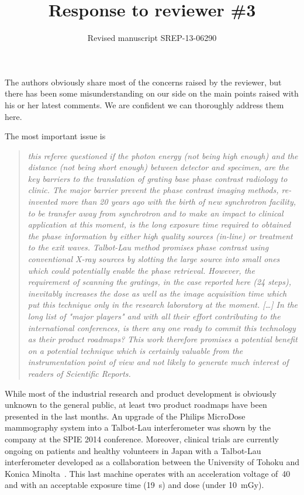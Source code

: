 \documentclass[a4paper,english]{scrartcl}
\title{Response to reviewer \#3}
\author{Revised manuscript SREP-13-06290}
\date{}
\newenvironment{reviewerquote}{\begin{quote}\itshape}{\end{quote}}
\begin{document}
\maketitle

\noindent

The authors obviously share most of the concerns raised by the reviewer, but
there has been some misunderstanding on our side on the main points raised
with his or her latest comments.
We are confident we can thoroughly address them here.

The most important issue is

\begin{reviewerquote}
    this referee questioned if the photon energy (not being high enough) and
    the distance (not being short enough) between detector and specimen, are
    the key barriers to the translation of grating base phase contrast
    radiology to clinic. The major barrier prevent the phase contrast
    imaging methods, re-invented more than 20 years ago with the birth of
    new synchrotron facility, to be transfer away from synchrotron and to
    make an impact to clinical application at this moment, is the long
    exposure time required to obtained the phase information by either high
    quality sources (in-line) or treatment to the exit waves. Talbot-Lau
    method promises phase contrast using conventional X-ray sources by
    slotting the large source into small ones which could potentially enable
    the phase retrieval. However, the requirement of scanning the gratings,
    in the case reported here (24 steps), inevitably increases the dose as
    well as the image acquisition time which put this technique only in the
    research laboratory at the moment. [\ldots] In the long list of "major
    players" and with all their effort contributing to the international
    conferences, is there any one ready to commit this technology as their
    product roadmaps? This work therefore promises a potential benefit on a
    potential technique which is certainly valuable from the instrumentation
    point of view and not likely to generate much interest of readers of
    Scientific Reports.
\end{reviewerquote}

While most of the industrial research and product development is obviously
unknown to the general public, at least two product roadmaps have been presented in
the last months. An upgrade of the Philips MicroDose mammography system into a
Talbot-Lau interferometer was shown by the company at the SPIE 
2014 conference\cite{Roessl2014}. Moreover, clinical trials are currently
ongoing on patients and healthy volunteers in Japan with a Talbot-Lau interferometer
developed as a collaboration between the University of Tohoku and Konica
Minolta~\cite{Momose06032014}. This last machine operates with an
acceleration voltage of~\SI{40}{\kilo\voltpeak} and with an acceptable
exposure time (\SI{19}{\second}) and dose (under \SI{10}{\milli\gray}).
\end{document}
